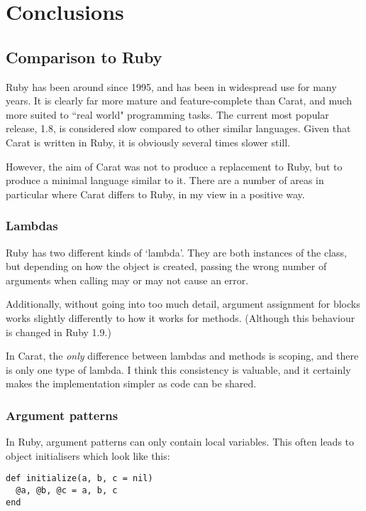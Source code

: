 \section{Conclusions}

\subsection{Comparison to Ruby}
\label{sec:ruby_comparison}

Ruby has been around since 1995, and has been in widespread use for many years. It is clearly far more mature and feature-complete than Carat, and much more suited to ``real world" programming tasks. The current most popular release, 1.8, is considered slow compared to other similar languages. Given that Carat is written in Ruby, it is obviously several times slower still.

However, the aim of Carat was not to produce a replacement to Ruby, but to produce a minimal language similar to it. There are a number of areas in particular where Carat differs to Ruby, in my view in a positive way.

\subsubsection{Lambdas}

Ruby has two different kinds of `lambda'. They are both instances of the  class, but depending on how the object is created, passing the wrong number of arguments when calling may or may not cause an error.

Additionally, without going into too much detail, argument assignment for blocks works slightly differently to how it works for methods. (Although this behaviour is changed in Ruby 1.9.)

In Carat, the \textit{only} difference between lambdas and methods is scoping, and there is only one type of lambda. I think this consistency is valuable, and it certainly makes the implementation simpler as code can be shared.

\subsubsection{Argument patterns}

In Ruby, argument patterns can only contain local variables. This often leads to object initialisers which look like this:

\begin{lstlisting}
def initialize(a, b, c = nil)
  @a, @b, @c = a, b, c
end
\end{lstlisting}

